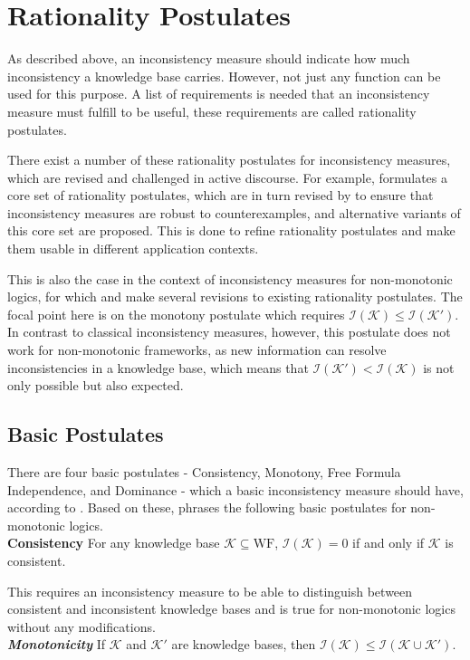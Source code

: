 \section{Rationality Postulates}
As described above, an inconsistency measure should indicate how much inconsistency a knowledge base carries. However, not just any function can be used for this purpose. A list of requirements is needed that an inconsistency measure must fulfill to be useful, these requirements are called rationality postulates.

There exist a number of these rationality postulates for inconsistency measures, which are revised and challenged in active discourse. For example, \cite{hunter_measure_2010} formulates a core set of rationality postulates, which are in turn revised by \cite{hameurlain_basic_2017} to ensure that inconsistency measures are robust to counterexamples, and alternative variants of this core set are proposed. This is done to refine rationality postulates and make them usable in different application contexts.

This is also the case in the context of inconsistency measures for non-monotonic logics, for which \cite{ulbricht_measuring_2018} and \cite{ulbricht_handling_2020} make several revisions to existing rationality postulates. The focal point here is on the monotony postulate which requires \(\mathcal{I}(\mathcal{K}) \leq \mathcal{I}(\mathcal{K}')\). In contrast to classical inconsistency measures, however, this postulate does not work for non-monotonic frameworks, as new information can resolve inconsistencies in a knowledge base, which means that \(\mathcal{I}(\mathcal{K}') < \mathcal{I}(\mathcal{K})\) is not only possible but also expected.

\subsection{Basic Postulates}
There are four basic postulates - Consistency, Monotony, Free Formula Independence, and Dominance - which a basic inconsistency measure should have, according to \cite{hunter_measure_2010}. Based on these, \cite{ulbricht_handling_2020} phrases the following basic postulates for non-monotonic logics.
\\
\textbf{Consistency}
For any knowledge base \(\mathcal{K} \subseteq \text{WF}\), \(\mathcal{I}(\mathcal{K}) = 0\) if and only if \(\mathcal{K}\) is consistent.

This requires an inconsistency measure to be able to distinguish between consistent and inconsistent knowledge bases and is true for non-monotonic logics without any modifications.
\\
\textit{\textbf{Monotonicity}}
If \(\mathcal{K}\) and \(\mathcal{K}'\) are knowledge bases, then \(\mathcal{I}(\mathcal{K}) \leq \mathcal{I}(\mathcal{K \cup \mathcal{K}'})\).

